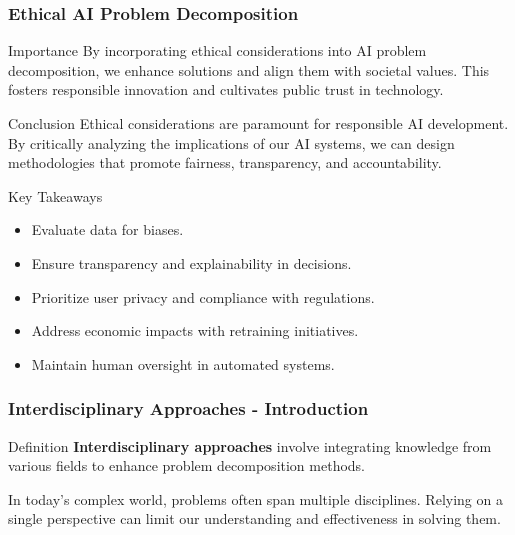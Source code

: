 \documentclass[aspectratio=169]{beamer}
\begin{document}
\begin{frame}[fragile]
    \frametitle{Ethical AI Problem Decomposition}
    \begin{block}{Importance}
        By incorporating ethical considerations into AI problem decomposition, we enhance solutions and align them with societal values. This fosters responsible innovation and cultivates public trust in technology.
    \end{block}

    \begin{block}{Conclusion}
        Ethical considerations are paramount for responsible AI development. By critically analyzing the implications of our AI systems, we can design methodologies that promote fairness, transparency, and accountability.
    \end{block}

    \begin{block}{Key Takeaways}
        \begin{itemize}
            \item Evaluate data for biases.
            \item Ensure transparency and explainability in decisions.
            \item Prioritize user privacy and compliance with regulations.
            \item Address economic impacts with retraining initiatives.
            \item Maintain human oversight in automated systems.
        \end{itemize}
    \end{block}
\end{frame}

\begin{frame}[fragile]
    \frametitle{Interdisciplinary Approaches - Introduction}
    \begin{block}{Definition}
        \textbf{Interdisciplinary approaches} involve integrating knowledge from various fields to enhance problem decomposition methods.
    \end{block}
    In today's complex world, problems often span multiple disciplines. Relying on a single perspective can limit our understanding and effectiveness in solving them.
\end{frame}
\end{document}
